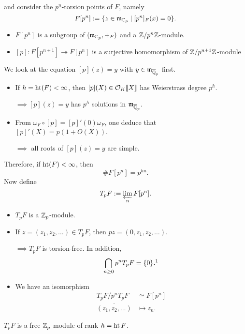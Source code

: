 and consider the $p^n$-torsion points of $F$, namely \[F[p^n] := \{z\in\mathfrak{m}_{\mathbb{C}_p}\mid [p^n]_F(x) = 0\}.\]
\begin{itemize}
    \item $F[p^n]$ is a subgroup of $(\mathfrak{m}_{\mathbb{C}_p}, +_F)$ and a $\mathbb{Z}/p^n\mathbb{Z}$-module.
    \item $[p] : F[p^{n+1}]\twoheadrightarrow F[p^n]$
    is a surjective homomorphism of $\mathbb{Z}/p^{n+1}\mathbb{Z}$-module
\end{itemize}
We look at the equation $[p](z) = y$ with $y\in\mathfrak{m}_{\overline{\mathbb{Q}}_p}$ first.
\begin{itemize}
    \item If $h = \operatorname{ht}(F) < \infty$,
    then $[p](X)\in \mathcal{O}_K\llbracket X \rrbracket$ has Weierstrass degree $p^h$.\par
    $\implies [p](z) = y$ has $p^h$ solutions in $\mathfrak{m}_{\overline{\mathbb{Q}}_p}$.
    \item From $\omega_F\circ [p] = [p]'(0)\omega_F$, one deduce that $[p]'(X) = p(1 + O(X))$.\par
    $\implies$ all roots of $[p](z) = y$ are simple.
\end{itemize}
Therefore, if $\operatorname{ht}(F) < \infty$, then \[\# F[p^n] = p^{hn}.\]
Now define \[T_pF := \varprojlim_n F[p^n].\]
\begin{itemize}
    \item $T_pF$ is a $\mathbb{Z}_p$-module.
    \item If $z = (z_1, z_2, \dots)\in T_pF$,
    then $pz = (0, z_1, z_2, \dots)$.\par
    $\implies T_pF$ is torsion-free. In addition,
    \[\bigcap_{n\ge 0} p^nT_pF = \{0\}.\footnotemark\]
    \item We have an isomorphism
    \begin{align*}
        T_pF/p^nT_pF &\simeq F[p^n]\\ 
        \overline{(z_1, z_2, \dots)} &\mapsto z_n.
    \end{align*}
\end{itemize}
\begin{proposition}
    $T_pF$ is a free $\mathbb{Z}_p$-module of rank $h = \operatorname{ht} F$.
\end{proposition}
